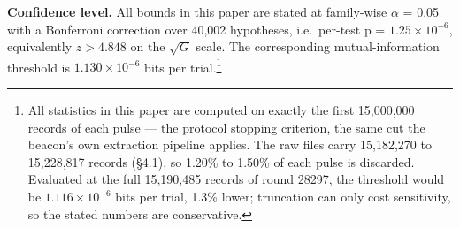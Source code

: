 \documentclass[
  11pt,
]{article}
\begin{document}
\textbf{Confidence level.} All bounds in this paper are stated at
family-wise \(\alpha\) = 0.05 with a Bonferroni correction over 40,002
hypotheses, i.e.~per-test p = \(1.25 \times 10^{-6}\), equivalently
\(z > 4.848\) on the \(\sqrt{G}\) scale. The corresponding
mutual-information threshold is \(1.130 \times 10^{-6}\) bits per
trial.\footnote{All statistics in this paper are computed on exactly the
  first 15,000,000 records of each pulse --- the protocol stopping
  criterion, the same cut the beacon's own extraction pipeline applies.
  The raw files carry 15,182,270 to 15,228,817 records (\S4.1), so
  1.20\% to 1.50\% of each pulse is discarded. Evaluated at the full
  15,190,485 records of round 28297, the threshold would be
  \(1.116 \times 10^{-6}\) bits per trial, 1.3\% lower; truncation can
  only cost sensitivity, so the stated numbers are conservative.}
\end{document}
